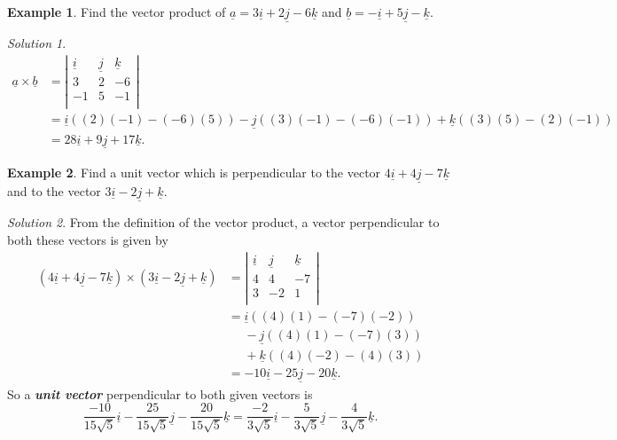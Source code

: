 \documentclass[
  11pt,
  oneside]{book}
\newcommand{\slide}{}
\theoremstyle{definition}
\theoremstyle{definition}
\newtheorem{example}{Example}[chapter]
\theoremstyle{definition}
\theoremstyle{definition}
\theoremstyle{remark}
\newtheorem*{solution}{Solution}
\begin{document}
\begin{example}
Find the vector product of \(\underline a=3\underline i+2\underline j-6\underline k\) and \(\underline b=-\underline i + 5\underline j-\underline k\).
\end{example}

\begin{solution}
\begin{align*}
\underline a \times\underline b& = \left|\begin{array}{ccc}\underline i&\underline j&\underline k\\3&2&-6\\-1&5&-1\\\end{array}\right|\\
&= \underline i((2)(-1)-(-6)(5))-\underline j((3)(-1)-(-6)(-1))+\underline k((3)(5)-(2)(-1))\\
&=28\underline i+9\underline j+17\underline k.
\end{align*}
\end{solution}

\slide

\begin{example}
Find a unit vector which is perpendicular to the vector \(4\underline i+4\underline j-7\underline k\) and to the vector \(3\underline i - 2\underline j+\underline k\).
\end{example}

\begin{solution}
From the definition of the vector product, a vector perpendicular to both these vectors is given by
\begin{align*}
(4\underline i+4\underline j-7\underline k) \times(3\underline i - 2\underline j+\underline k)& = \left|\begin{array}{ccc}\underline i&\underline j&\underline k\\4&4&-7\\3&-2&1\\\end{array}\right|\\
&= \underline i((4)(1)-(-7)(-2))\\
&\phantom{= }-\underline j((4)(1)-(-7)(3))\\
&\phantom{= }+\underline k((4)(-2)-(4)(3))\\
&=-10\underline i-25\underline j-20\underline k.
\end{align*}
So a \textbf{\emph{unit vector}} perpendicular to both given vectors is
\[
\frac{-10}{15\sqrt{5}}\underline i-\frac{25}{15\sqrt{5}}\underline j-\frac{20}{15\sqrt{5}}\underline k = \frac{-2}{3\sqrt{5}}\underline i-\frac{5}{3\sqrt{5}}\underline j-\frac{4}{3\sqrt{5}}\underline k.
\]
\end{solution}
\end{document}
